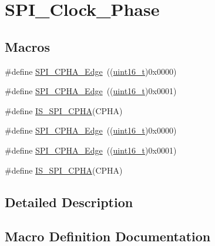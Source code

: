 \hypertarget{group___s_p_i___clock___phase}{}\section{S\+P\+I\+\_\+\+Clock\+\_\+\+Phase}
\label{group___s_p_i___clock___phase}
\subsection*{Macros}
\begin{DoxyCompactItemize}
\item 
\#define \hyperlink{group___s_p_i___clock___phase_gaade9d9555fac8a302bde5c94da9c7292}{S\+P\+I\+\_\+\+C\+P\+H\+A\+\_\+Edge}~((\hyperlink{_p_e___types_8h_a1f1825b69244eb3ad2c7165ddc99c956}{uint16\+\_\+t})0x0000)
\item 
\#define \hyperlink{group___s_p_i___clock___phase_ga7543f88bf05a08705eb4203862dcebdf}{S\+P\+I\+\_\+\+C\+P\+H\+A\+\_\+Edge}~((\hyperlink{_p_e___types_8h_a1f1825b69244eb3ad2c7165ddc99c956}{uint16\+\_\+t})0x0001)
\item 
\#define \hyperlink{group___s_p_i___clock___phase_ga6441f08edf79dd5b243c54b888d3cbf7}{I\+S\+\_\+\+S\+P\+I\+\_\+\+C\+P\+HA}(C\+P\+HA)
\item 
\#define \hyperlink{group___s_p_i___clock___phase_gaade9d9555fac8a302bde5c94da9c7292}{S\+P\+I\+\_\+\+C\+P\+H\+A\+\_\+Edge}~((\hyperlink{_p_e___types_8h_a1f1825b69244eb3ad2c7165ddc99c956}{uint16\+\_\+t})0x0000)
\item 
\#define \hyperlink{group___s_p_i___clock___phase_ga7543f88bf05a08705eb4203862dcebdf}{S\+P\+I\+\_\+\+C\+P\+H\+A\+\_\+Edge}~((\hyperlink{_p_e___types_8h_a1f1825b69244eb3ad2c7165ddc99c956}{uint16\+\_\+t})0x0001)
\item 
\#define \hyperlink{group___s_p_i___clock___phase_ga6441f08edf79dd5b243c54b888d3cbf7}{I\+S\+\_\+\+S\+P\+I\+\_\+\+C\+P\+HA}(C\+P\+HA)
\end{DoxyCompactItemize}


\subsection{Detailed Description}


\subsection{Macro Definition Documentation}
